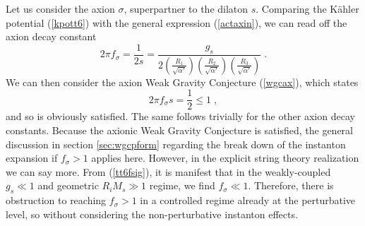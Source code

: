 \documentclass[11pt,a4paper]{article}
\numberwithin{equation}{section}
\numberwithin{table}{section}\setlength{\multlinegap}{25pt}
\newcommand{\be}{\begin{equation}}
\newcommand{\ee}{\end{equation}}
\begin{document}
Let us consider the axion $\sigma$, superpartner to the dilaton $s$. Comparing the K{\"a}hler potential (\ref{kpott6}) with the general expression (\ref{actaxin}), we can read off the axion decay constant
\be
2\pi f_{\sigma} = \frac{1}{2s} = \frac{g_s}{2 \left( \frac{R_1}{\sqrt{\alpha'}} \right) \left( \frac{R_2}{\sqrt{\alpha'}}  \right) \left( \frac{R_3}{\sqrt{\alpha'}}  \right)} \;.
\label{tt6fsig}
\ee
We can then consider the axion Weak Gravity Conjecture (\ref{wgcax}), which states
\be
2 \pi f_{\sigma} s = \frac{1}{2} \leq 1 \;,
\ee
and so is obviously satisfied. The same follows trivially for the other axion decay constants. Because the axionic Weak Gravity Conjecture is satisfied, the general discussion in section \ref{sec:wgcpform} regarding the break down of the instanton expansion if $f_{\sigma} > 1$ applies here.  However, in the explicit string theory realization we can say more. From (\ref{tt6fsig}), it is manifest that in the weakly-coupled $g_s \ll 1$ and geometric $R_i M_s \gg 1$ regime, we find $f_{\sigma} \ll 1$. Therefore, there is obstruction to reaching $f_{\sigma} > 1$ in a controlled regime already at the perturbative level, so without considering the non-perturbative instanton effects. 
\end{document}
